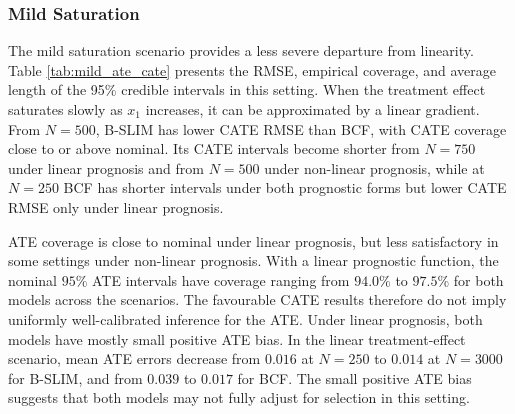 \documentclass[12pt]{article}
\begin{document}
\subsubsection{Mild Saturation}

The mild saturation scenario provides a less severe departure from linearity. Table \ref{tab:mild_ate_cate} presents the RMSE, empirical coverage, and average length of the 95\% credible intervals in this setting. When the treatment effect saturates slowly as $x_1$ increases, it can be approximated by a linear gradient. From $N=500$, B-SLIM has lower CATE RMSE than BCF, with CATE coverage close to or above nominal. Its CATE intervals become shorter from $N=750$ under linear prognosis and from $N=500$ under non-linear prognosis, while at $N=250$ BCF has shorter intervals under both prognostic forms but lower CATE RMSE only under linear prognosis.

ATE coverage is close to nominal under linear prognosis, but less satisfactory in some settings under non-linear prognosis. With a linear prognostic function, the nominal $95\%$ ATE intervals have coverage ranging from $94.0\%$ to $97.5\%$ for both models across the scenarios. The favourable CATE results therefore do not imply uniformly well-calibrated inference for the ATE. Under linear prognosis, both models have mostly small positive ATE bias. In the linear treatment-effect scenario, mean ATE errors decrease from $0.016$ at $N=250$ to $0.014$ at $N=3000$ for B-SLIM, and from $0.039$ to $0.017$ for BCF. The small positive ATE bias suggests that both models may not fully adjust for selection in this setting.
\end{document}
